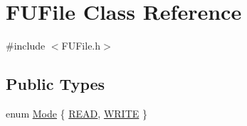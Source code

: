 \hypertarget{classFUFile}{
\section{FUFile Class Reference}
\label{classFUFile}
}


{\ttfamily \#include $<$FUFile.h$>$}

\subsection*{Public Types}
\begin{DoxyCompactItemize}
\item 
enum \hyperlink{classFUFile_a68a459ccb913df26fe3cf6b123522849}{Mode} \{ \hyperlink{classFUFile_a68a459ccb913df26fe3cf6b123522849a720d45bf59ced12f7285a497effb2a06}{READ}, 
\hyperlink{classFUFile_a68a459ccb913df26fe3cf6b123522849a75ef4d7c51bce81db06487c168b76a49}{WRITE}
 \}
\end{DoxyCompactItemize}
